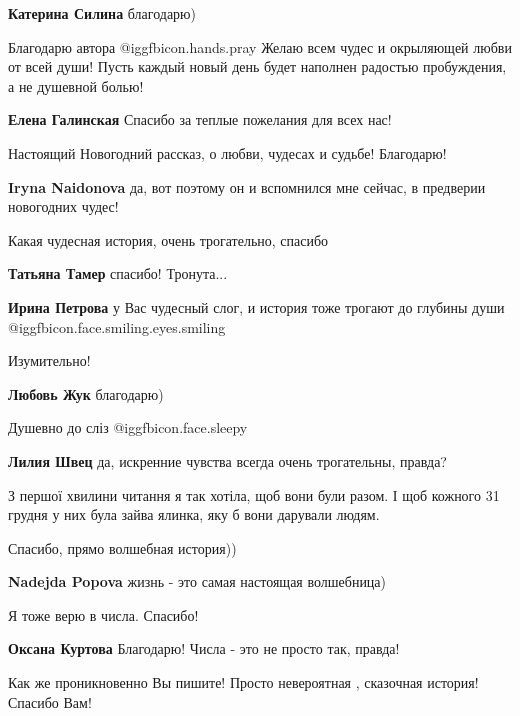 \begin{itemize}
\textbf{Катерина Силина} благодарю)


Благодарю автора  @igg{fbicon.hands.pray}  Желаю всем чудес и окрыляющей любви от всей души! Пусть
каждый новый день будет наполнен радостью пробуждения, а не душевной болью!

\textbf{Елена Галинская} Спасибо за теплые пожелания для всех нас!

Настоящий Новогодний рассказ, о любви, чудесах и судьбе! Благодарю!

\textbf{Iryna Naidonova} да, вот поэтому он и вспомнился мне сейчас, в предверии новогодних чудес!

Какая чудесная история, очень трогательно, спасибо

\begin{itemize} %
\textbf{Татьяна Тамер} спасибо! Тронута...

\textbf{Ирина Петрова} у Вас чудесный слог, и история тоже трогают до глубины души  @igg{fbicon.face.smiling.eyes.smiling} 
\end{itemize} %

Изумительно!

\textbf{Любовь Жук} благодарю)

Душевно до сліз @igg{fbicon.face.sleepy} 

\begin{itemize} %
\textbf{Лилия Швец} да, искренние чувства всегда очень трогательны, правда?


З першої хвилини читання я так хотіла, щоб вони були разом. І щоб кожного 31
грудня у них була зайва ялинка, яку б вони дарували людям.

\end{itemize} %

Спасибо, прямо волшебная история))

\textbf{Nadejda Popova} жизнь - это самая настоящая волшебница)

Я тоже верю в числа. Спасибо!

\textbf{Оксана Куртова} Благодарю! Числа - это не просто так, правда!

Как же проникновенно Вы пишите! Просто невероятная , сказочная история! Спасибо Вам!


\end{itemize}

